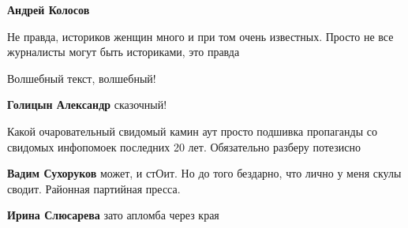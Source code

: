 \begin{itemize}
\begin{itemize}
\textbf{Андрей Колосов} 

Не правда, историков женщин много и при том очень известных. Просто не все журналисты могут быть историками, это правда

\end{itemize}

 
Волшебный текст, волшебный! \Smiley[1.0][yellow] \Smiley[1.0][yellow]

\begin{itemize}
 
\textbf{Голицын Александр} сказочный!
\end{itemize}

 

Какой очаровательный свидомый камин аут \Smiley[1.0][yellow] просто подшивка пропаганды со
свидомых инфопомоек последних 20 лет. Обязательно разберу потезисно \Smiley[1.0][yellow]

\begin{itemize}
 
\textbf{Вадим Сухоруков} может, и стОит. Но до того бездарно, что лично у меня скулы сводит. Районная партийная пресса.

 
\textbf{Ирина Слюсарева} зато апломба через края \Laughey[1.0][white]



\end{itemize}
\end{itemize}
